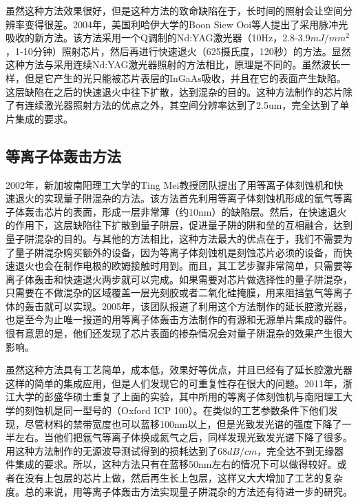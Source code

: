 \documentclass[oneside]{ZJUthesis}
\begin{document}
虽然这种方法效果很好，但是这种方法的致命缺陷在于，长时间的照射会让空间分辨率变得很差。2004年，美国利哈伊大学的Boon Siew Ooi等人提出了采用脉冲光吸收的新方法\cite{ooi2004multiple}。该方法采用一个Q调制的Nd:YAG激光器（10Hz，2.8-3.9$mJ/mm^2$，1-10分钟）照射芯片，然后再进行快速退火（625摄氏度，120秒）的方法。显然这种方法与采用连续Nd:YAG激光器照射的方法相比，原理是不同的。虽然波长一样，但是它产生的光只能被芯片表层的InGaAs吸收，并且在它的表面产生缺陷。这层缺陷在之后的快速退火中往下扩散，达到混杂的目的。这种方法制作的芯片除了有连续激光器照射方法的优点之外，其空间分辨率达到了2.5um，完全达到了单片集成的要求。

\subsection{等离子体轰击方法}

2002年，新加坡南阳理工大学的Ting Mei教授团队提出了用等离子体刻蚀机和快速退火的实现量子阱混杂的方法\cite{djie2002high}。该方法首先利用等离子体刻蚀机形成的氩气等离子体轰击芯片的表面，形成一层非常薄（约10nm）的缺陷层。然后，在快速退火的作用下，这层缺陷往下扩散到量子阱层，促进量子阱的阱和垒的互相融合，达到量子阱混杂的目的。与其他的方法相比，这种方法最大的优点在于，我们不需要为了量子阱混杂购买额外的设备，因为等离子体刻蚀机是刻蚀芯片必须的设备，而快速退火也会在制作电极的欧姆接触时用到。而且，其工艺步骤非常简单，只需要等离子体轰击和快速退火两步就可以完成。如果需要对芯片做选择性的量子阱混杂，只需要在不做混杂的区域覆盖一层光刻胶或者二氧化硅掩膜，用来阻挡氩气等离子体的轰击就可以实现。2005年，该团队报道了利用这个方法制作的延长腔激光器\cite{djie2005plasma}，也是至今为止唯一报道的用等离子体轰击方法制作的有源和无源单片集成的器件。很有意思的是，他们还发现了芯片表面的掺杂情况会对量子阱混杂的效果产生很大影响\cite{xu2009inductively}。

虽然这种方法具有工艺简单，成本低，效果好等优点，并且已经有了延长腔激光器这样的简单的集成应用，但是人们发现它的可重复性存在很大的问题。2011年，浙江大学的彭盛华硕士重复了上面的实验\cite{peng2011argon}，其中所用的等离子体刻蚀机与南阳理工大学的刻蚀机是同一型号的（Oxford ICP 100）。在类似的工艺参数条件下他们发现，尽管材料的禁带宽度也可以蓝移100nm以上，但是光致发光谱的强度下降了一半左右。当他们把氩气等离子体换成氮气之后，同样发现光致发光谱下降了很多\cite{peng2009nitrogen-nitrogen}。用这种方法制作的无源波导测试得到的损耗达到了$68dB/cm$\cite{zhang2010optical-waveguide_test}，完全达不到无缘器件集成的要求。所以，这种方法只有在蓝移50nm左右的情况下可以做得较好。或者在没有上包层的芯片上做，然后再生长上包层，这样又大大增加了工艺的复杂度。总的来说，用等离子体轰击方法实现量子阱混杂的方法还有待进一步的研究。
\end{document}
